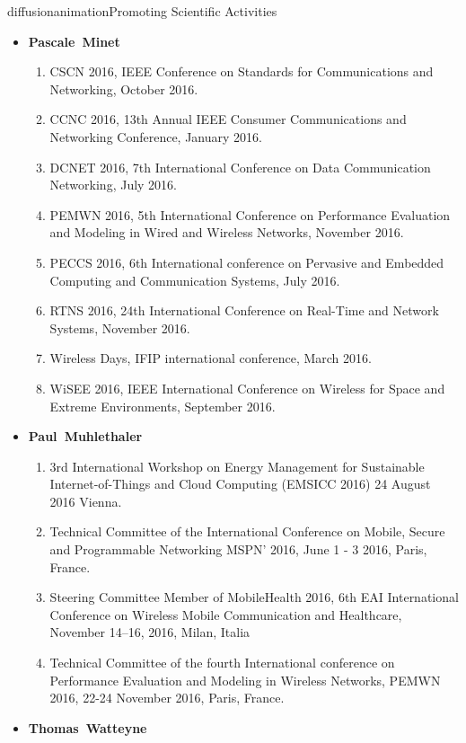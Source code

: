 \documentclass{ra2016}
\newcommand{\paul}             {\textbf{Paul~Muhlethaler}}
\newcommand{\pascale}          {\textbf{Pascale~Minet}}
\newcommand{\thomas}           {\textbf{Thomas~Watteyne}}
\begin{document}
\begin{module}{diffusion}{animation}{Promoting Scientific Activities}
\begin{itemize}
    \item \pascale
        \begin{enumerate}
            \item CSCN 2016,  IEEE  Conference on Standards for Communications and Networking, October 2016.
            \item CCNC 2016, 13th Annual IEEE Consumer Communications and Networking Conference, January 2016.
            \item DCNET 2016, 7th International Conference on Data Communication Networking, July 2016.
            \item PEMWN 2016, 5th International Conference on Performance Evaluation and Modeling in Wired and Wireless Networks, November 2016.
            \item PECCS 2016, 6th International conference on Pervasive and Embedded Computing and Communication Systems, July 2016.
            \item RTNS 2016, 24th International Conference on Real-Time and Network Systems, November 2016.
            \item Wireless Days, IFIP international conference, March 2016.
            \item WiSEE 2016, IEEE International Conference on Wireless for Space and Extreme Environments, September 2016.
          \end{enumerate}
    \item \paul
        \begin{enumerate}
            \item 3rd International Workshop on Energy Management for Sustainable Internet-of-Things and Cloud Computing (EMSICC 2016) 24 August 2016 Vienna. 
            \item Technical Committee of the International Conference on Mobile, Secure and Programmable Networking MSPN' 2016, June 1 - 3 2016, Paris, France. 
            \item Steering Committee Member of MobileHealth 2016, 6th  EAI International Conference on Wireless Mobile Communication and Healthcare,  November 14–16, 2016, Milan, Italia   
            \item Technical Committee of the fourth International conference on Performance Evaluation and Modeling in Wireless Networks, PEMWN 2016, 22-24 November 2016, Paris, France. 
        \end{enumerate}
    \item \thomas
        \begin{enumerate}

\end{enumerate}
\end{itemize}
\end{module}
\end{document}
